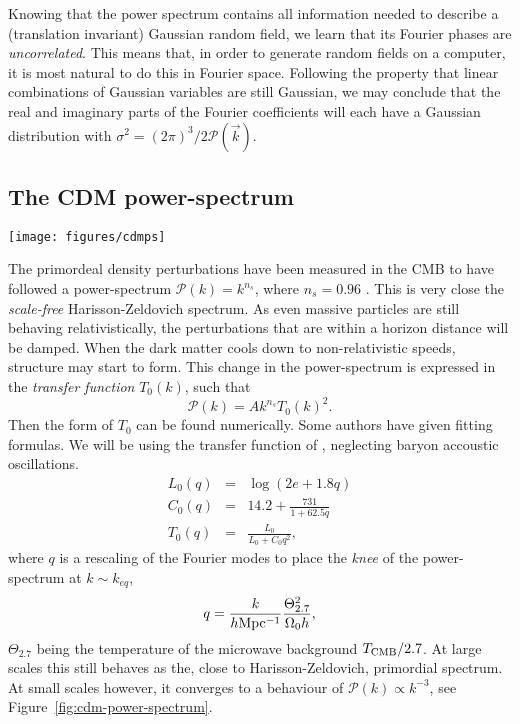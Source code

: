 \begin{subappendices}
Knowing that the power spectrum contains all information needed to describe a (translation invariant) Gaussian random field, we learn that its Fourier phases are \emph{uncorrelated}. This means that, in order to generate random fields on a computer, it is most natural to do this in Fourier space. Following the property that linear combinations of Gaussian variables are still Gaussian, we may conclude that the real and imaginary parts of the Fourier coefficients will each have a Gaussian distribution with $\sigma^2 = {(2\pi)}^3/2 \mathcal{P}(\vec{k})$.


\subsection{The CDM power-spectrum}
\begin{SCfigure}[1.0]
    \texttt{[image: figures/cdmps]}
    \caption{The CDM power-spectrum. This is the power-spectrum $\mathcal{P}(k)$ of density fluctuations for pure cold dark matter. On the large scale end, it shows a behaviour tending towards $\mathcal{P}(k) \sim k$, while the small scale fluctuations have damped to a spectrum of $\mathcal{P}(k) \sim k^{-3}$.} \label{fig:cdm-power-spectrum}
\end{SCfigure}

The primordeal density perturbations have been measured in the CMB to have followed a power-spectrum $\mathcal{P}(k) = k^{n_s}$, where $n_s = 0.96$ \citep{Planck2013-cosmo}. This is very close the \emph{scale-free} Harisson-Zeldovich spectrum. As even massive particles are still behaving relativistically, the perturbations that are within a horizon distance will be damped. When the dark matter cools down to non-relativistic speeds, structure may start to form. This change in the power-spectrum is expressed in the \emph{transfer function} $T_0(k)$, such that
\[\mathcal{P}(k) = A k^{n_s} {T_0(k)}^2.\]
Then the form of $T_0$ can be found numerically. Some authors \citep{bbks,Eisenstein1998,Eisenstein1999} have given fitting formulas. We will be using the transfer function of \citet{Eisenstein1998}, neglecting baryon accoustic oscillations.
\begin{eqnarray}
    L_0(q) &=& \log(2 e + 1.8 q) \\
    C_0(q) &=& 14.2 + \frac{731}{1 + 62.5 q} \\
    T_0(q) &=& \frac{L_0}{L_0 + C_0 q^2},
\end{eqnarray}
where $q$ is a rescaling of the Fourier modes to place the \emph{knee} of the power-spectrum at $k \sim k_{eq}$,
\[q = \frac{k}{h {\rm Mpc^{-1}}} \frac{\Theta^2_{2.7}}{\Omega_0 h},\]
$\Theta_{2.7}$ being the temperature of the microwave background $T_{\rm CMB}/2.7$. At large scales this still behaves as the, close to Harisson-Zeldovich, primordial spectrum. At small scales however, it converges to a behaviour of $\mathcal{P}(k) \propto k^{-3}$, see Figure~\ref{fig:cdm-power-spectrum}.


\end{subappendices}
